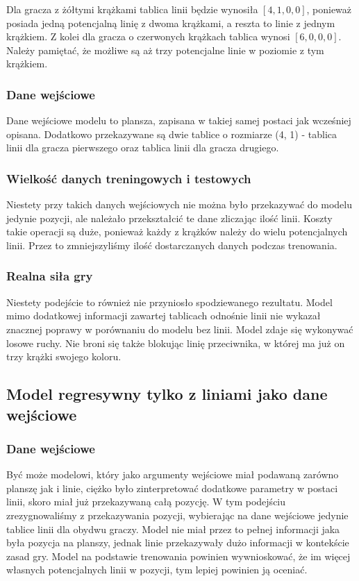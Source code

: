 \documentclass[12pt]{article}
\begin{document}
\noindent Dla gracza z żółtymi krążkami tablica linii będzie wynosiła $[4, 1, 0, 0]$, ponieważ posiada jedną potencjalną linię z dwoma krążkami, a reszta to linie z jednym krążkiem. Z kolei dla gracza o czerwonych krążkach tablica wynosi $[6, 0, 0, 0]$. Należy pamiętać, że możliwe są aż trzy potencjalne linie w poziomie z tym krążkiem.

\subsubsection{Dane wejściowe}

Dane wejściowe modelu to plansza, zapisana w takiej samej postaci jak wcześniej opisana. Dodatkowo przekazywane są dwie tablice o rozmiarze (4, 1) - tablica linii dla gracza pierwszego oraz tablica linii dla gracza drugiego.

\subsubsection{Wielkość danych treningowych i testowych}

Niestety przy takich danych wejściowych nie można było przekazywać do modelu jedynie pozycji, ale należało przekształcić te dane zliczając ilość linii. Koszty takie operacji są duże, ponieważ każdy z krążków należy do wielu potencjalnych linii. Przez to zmniejszyliśmy ilość dostarczanych danych podczas trenowania.

\subsubsection{Realna siła gry}
Niestety podejście to również nie przyniosło spodziewanego rezultatu. Model mimo dodatkowej informacji zawartej tablicach odnośnie linii nie wykazał znacznej poprawy w porównaniu do modelu bez linii. Model zdaje się wykonywać losowe ruchy. Nie broni się także blokując linię przeciwnika,  w której ma już on trzy krążki swojego koloru.

\subsection{Model regresywny tylko z liniami jako dane wejściowe}

\subsubsection{Dane wejściowe}

Być może modelowi, który jako argumenty wejściowe miał podawaną zarówno planszę jak i linie, ciężko było zinterpretować dodatkowe parametry w postaci linii, skoro miał już przekazywaną całą pozycję. W tym podejściu zrezygnowaliśmy z przekazywania pozycji, wybierając na dane wejściowe jedynie tablice linii dla obydwu graczy. Model nie miał przez to pełnej informacji jaka była pozycja na planszy, jednak linie przekazywały dużo informacji w kontekście zasad gry. Model na podstawie trenowania powinien wywnioskować, że im więcej własnych potencjalnych linii w pozycji, tym lepiej powinien ją oceniać.
\end{document}
